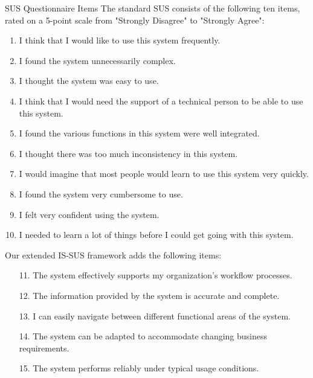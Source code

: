 \documentclass[blindrev]{informs3}
\begin{document}
% 

\begin{APPENDIX}{SUS Questionnaire Items}
The standard SUS consists of the following ten items, rated on a 5-point scale from "Strongly Disagree" to "Strongly Agree":

\begin{enumerate}
    \item I think that I would like to use this system frequently.
    \item I found the system unnecessarily complex.
    \item I thought the system was easy to use.
    \item I think that I would need the support of a technical person to be able to use this system.
    \item I found the various functions in this system were well integrated.
    \item I thought there was too much inconsistency in this system.
    \item I would imagine that most people would learn to use this system very quickly.
    \item I found the system very cumbersome to use.
    \item I felt very confident using the system.
    \item I needed to learn a lot of things before I could get going with this system.
\end{enumerate}

Our extended IS-SUS framework adds the following items:

\begin{enumerate}
    \item[11.] The system effectively supports my organization's workflow processes.
    \item[12.] The information provided by the system is accurate and complete.
    \item[13.] I can easily navigate between different functional areas of the system.
    \item[14.] The system can be adapted to accommodate changing business requirements.
    \item[15.] The system performs reliably under typical usage conditions.
\end{enumerate}
\end{APPENDIX}
\end{document}
